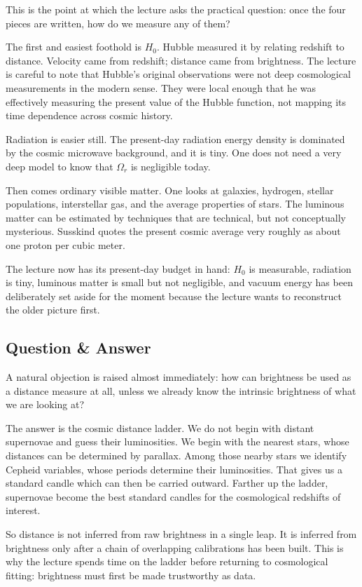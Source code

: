This is the point at which the lecture asks the practical question: once the four pieces are written, how do we measure any of them?

The first and easiest foothold is \(H_0\). Hubble measured it by relating redshift to distance. Velocity came from redshift; distance came from brightness. The lecture is careful to note that Hubble's original observations were not deep cosmological measurements in the modern sense. They were local enough that he was effectively measuring the present value of the Hubble function, not mapping its time dependence across cosmic history.

Radiation is easier still. The present-day radiation energy density is dominated by the cosmic microwave background, and it is tiny. One does not need a very deep model to know that \(\Omega_r\) is negligible today.

Then comes ordinary visible matter. One looks at galaxies, hydrogen, stellar populations, interstellar gas, and the average properties of stars. The luminous matter can be estimated by techniques that are technical, but not conceptually mysterious. Susskind quotes the present cosmic average very roughly as about one proton per cubic meter.

The lecture now has its present-day budget in hand: \(H_0\) is measurable, radiation is tiny, luminous matter is small but not negligible, and vacuum energy has been deliberately set aside for the moment because the lecture wants to reconstruct the older picture first.

\subsection{Question \& Answer}

A natural objection is raised almost immediately: how can brightness be used as a distance measure at all, unless we already know the intrinsic brightness of what we are looking at?

The answer is the cosmic distance ladder. We do not begin with distant supernovae and guess their luminosities. We begin with the nearest stars, whose distances can be determined by parallax. Among those nearby stars we identify Cepheid variables, whose periods determine their luminosities. That gives us a standard candle which can then be carried outward. Farther up the ladder, supernovae become the best standard candles for the cosmological redshifts of interest.

So distance is not inferred from raw brightness in a single leap. It is inferred from brightness only after a chain of overlapping calibrations has been built. This is why the lecture spends time on the ladder before returning to cosmological fitting: brightness must first be made trustworthy as data.

